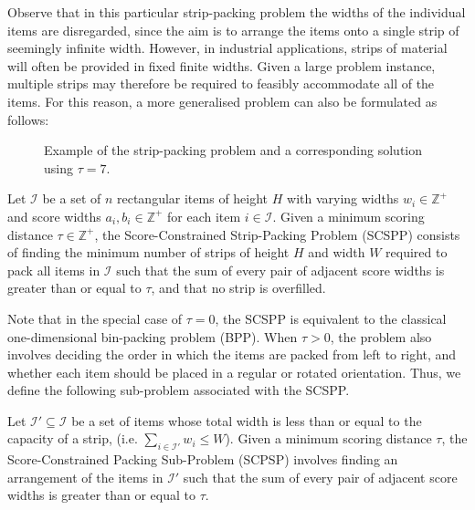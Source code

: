 \documentclass[runningheads]{llncs}
\begin{document}
Observe that in this particular strip-packing problem the widths of the individual items are disregarded, since the aim is to arrange the items onto a single strip of seemingly infinite width. However, in industrial applications, strips of material will often be provided in fixed finite widths. Given a large problem instance, multiple strips may therefore be required to feasibly accommodate all of the items. For this reason, a more generalised problem can also be formulated as follows:

\begin{figure}	
	\centering
	\begin{subfigure}[h]{0.5\textwidth}
		
		\label{fig:items}
	\end{subfigure} 
	\begin{subfigure}[h]{0.8\textwidth}
		
		\label{fig:itemsaligned}
	\end{subfigure}
	\caption{Example of the strip-packing problem and a corresponding solution using $\tau = 7$.}
	\label{fig:items/aligned}
\end{figure}

\begin{definition}
	Let $\mathcal{I}$ be a set of $n$ rectangular items of height $H$ with varying widths $w_i \in \mathbb{Z}^+$ and score widths $a_i, b_i \in \mathbb{Z}^+$ for each item $i \in \mathcal{I}$. Given a minimum scoring distance $\tau \in \mathbb{Z}^+$, the Score-Constrained Strip-Packing Problem (SCSPP) consists of finding the minimum number of strips of height $H$ and width $W$ required to pack all items in $\mathcal{I}$ such that the sum of every pair of adjacent score widths is greater than or equal to $\tau$, and that no strip is overfilled.
\end{definition}

\noindent Note that in the special case of $\tau = 0$, the SCSPP is equivalent to the classical one-dimensional bin-packing problem (BPP). When $\tau > 0$, the problem also involves deciding the order in which the items are packed from left to right, and whether each item should be placed in a regular or rotated orientation. Thus, we define the following sub-problem associated with the SCSPP.

\begin{definition}
	\label{defn:subprob}
	Let $\mathcal{I}' \subseteq \mathcal{I}$ be a set of items whose total width is less than or equal to the capacity of a strip, (i.e. $\sum_{i\in \mathcal{I}'}w_i \leq W$). Given a minimum scoring distance $\tau$, the Score-Constrained Packing Sub-Problem (SCPSP) involves finding an arrangement of the items in $\mathcal{I}'$ such that the sum of every pair of adjacent score widths is greater than or equal to $\tau$.
\end{definition}
\end{document}
